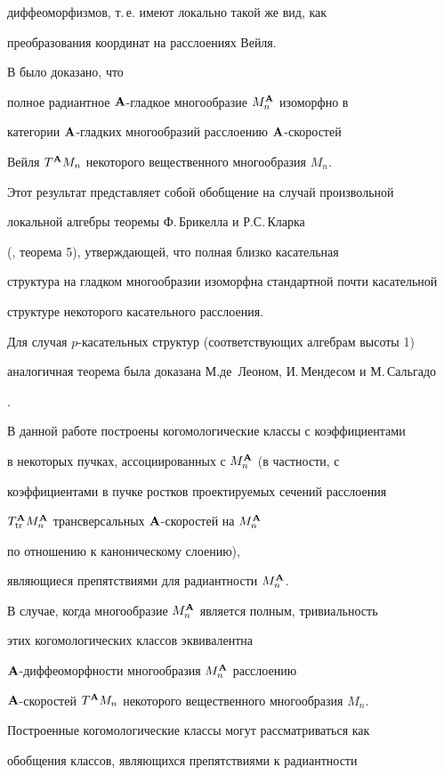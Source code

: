 диффеоморфизмов, т.\,е. имеют локально такой же вид, как


преобразования координат на расслоениях Вейля.


В \cite{VSh17} было доказано, что


полное радиантное ${\bold A}$-гладкое многообразие $M^{\bold A}_n$ изоморфно в


категории ${\bold A}$-гладких многообразий  расслоению ${\bold A}$-скоростей


Вейля $T^{\bold A} M_n$ некоторого вещественного многообразия $M_n$.


Этот результат представляет собой обобщение на случай произвольной


локальной алгебры теоремы Ф.\,Брикелла и Р.С.\,Кларка


(\cite{Br-Cl}, теорема 5), утверждающей, что полная близко  касательная


структура на гладком многообразии изоморфна стандартной почти касательной


структуре некоторого касательного расслоения.


Для случая $p$-касательных структур (соответствующих алгебрам высоты 1)


аналогичная теорема была доказана М.\;де~Леоном, И.\,Мендесом и М.\,Сальгадо


\cite{L-M-S}.





В данной работе построены когомологические классы с коэффициентами


в некоторых пучках, ассоциированных с $M^{\bold A}_n$ (в частности, с


коэффициентами в пучке ростков  проектируемых сечений расслоения


$T^{\bold A}_{\operatorname{tr}}M^{\bold A}_n$ трансверсальных ${\bold A}$-скоростей на $M^{\bold A}_n$


по отношению к каноническому слоению),


являющиеся препятствиями для радиантности  $M^{\bold A}_n$.


В случае, когда многообразие $M^{\bold A}_n$ является полным, тривиальность


этих  когомологических классов эквивалентна


${\bold A}$-диффеоморфности многообразия $M^{\bold A}_n$  расслоению


${\bold A}$-скоростей $T^{\bold A} M_n$ некоторого вещественного многообразия $M_n$.


Построенные когомологические классы могут рассматриваться как


обобщения классов, являющихся препятствиями к радиантности


